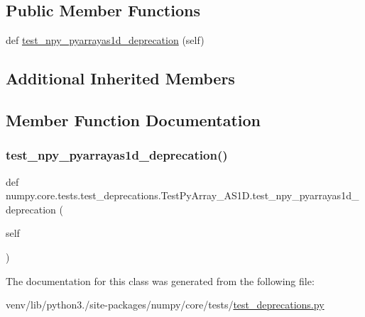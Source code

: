 \subsection*{Public Member Functions}
\begin{DoxyCompactItemize}
\item 
def \hyperlink{classnumpy_1_1core_1_1tests_1_1test__deprecations_1_1TestPyArray__AS1D_aedbb06383a7fa33f2dc823aea6b93cdf}{test\+\_\+npy\+\_\+pyarrayas1d\+\_\+deprecation} (self)
\end{DoxyCompactItemize}
\subsection*{Additional Inherited Members}


\subsection{Member Function Documentation}
\mbox{\label{classnumpy_1_1core_1_1tests_1_1test__deprecations_1_1TestPyArray__AS1D_aedbb06383a7fa33f2dc823aea6b93cdf}} 
\subsubsection{\texorpdfstring{test\+\_\+npy\+\_\+pyarrayas1d\+\_\+deprecation()}{test\_npy\_pyarrayas1d\_deprecation()}}
{\footnotesize\ttfamily def numpy.\+core.\+tests.\+test\+\_\+deprecations.\+Test\+Py\+Array\+\_\+\+A\+S1\+D.\+test\+\_\+npy\+\_\+pyarrayas1d\+\_\+deprecation (\begin{DoxyParamCaption}\item[{}]{self }\end{DoxyParamCaption})}



The documentation for this class was generated from the following file\+:\begin{DoxyCompactItemize}
\item 
venv/lib/python3./site-\/packages/numpy/core/tests/\hyperlink{core_2tests_2test__deprecations_8py}{test\+\_\+deprecations.\+py}\end{DoxyCompactItemize}
